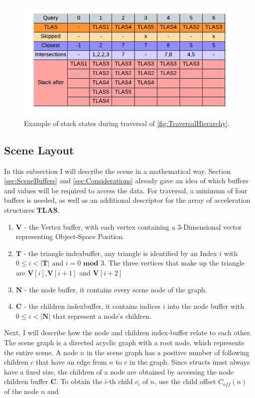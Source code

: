 \begin{figure}
    \centering
    \includegraphics[width=.7\textwidth]{images/showcase/TraversalTable.pdf}
    \caption{Example of stack states during traversal of \ref{fig:TraversalHierarchy}.}
    \label{fig:TraversalStackTable}
\end{figure}
\newpage
\subsection{Scene Layout}
\label{sec:SceneLayout}
In this subsection I will describe the scene in a mathematical way. Section \ref{sec:SceneBuffers} and \ref{sec:Considerations} already gave an idea of which buffers and values will be required to access the data.
For traversal, a minimum of four buffers is needed, as well as an additional descriptor for the array of acceleration structures $\mathbf{TLAS}$.
\begin{enumerate}
    \item $\mathbf{V}$ - the Vertex buffer, with each vertex containing a 3-Dimensional vector representing Object-Space Position.
    \item $\mathbf{T}$ - the triangle indexbuffer, any triangle is identified by an Index $i$ with $0 \leq i<|\mathbf{T}|$ and $i = 0$ $\mathbf{mod}$ $3$. The three vertices that make up the triangle are $\mathbf{V}[i]$,$\mathbf{V}[i+1]$ and $\mathbf{V}[i+2]$
    \item $\mathbf{N}$ - the node buffer, it contains every scene node of the graph.
    \item $\mathbf{C}$ - the children indexbuffer, it contains indices $i$ into the node buffer with $0\leq i < |\mathbf{N}|$ that represent a node's children.
\end{enumerate}
Next, I will describe how the node and children index-buffer relate to each other.\\
The scene graph is a directed acyclic graph with a root node, which represents the entire scene. A node $n$ in the scene graph has a positive number of following children $c$ that have an edge from $n$ to $c$ in the graph. Since structs must always have a fixed size, the children of a node are obtained by accessing the node children buffer $\mathbf{C}$. To obtain the $i$-th child $c_i$ of $n$, use the child offset $C_{off}(n)$ of the node $n$ and 
